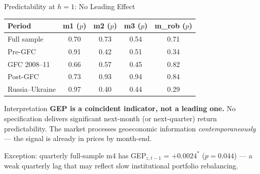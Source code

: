 \documentclass[aspectratio=169]{beamer}
\begin{document}
\begin{frame}{Predictability at $h=1$: No Leading Effect}

\begin{center}
\footnotesize
\renewcommand{\arraystretch}{1.25}
\begin{tabular}{@{}lcccc@{}}
\toprule
\textbf{Period} & \textbf{m1} ($p$) & \textbf{m2} ($p$) & \textbf{m3} ($p$) & \textbf{m\_rob} ($p$) \\
\midrule
Full sample    & 0.70 & 0.73 & 0.54 & 0.71 \\
Pre-GFC        & 0.91 & 0.42 & 0.51 & 0.34 \\
GFC 2008--11   & 0.66 & 0.57 & 0.45 & 0.82 \\
Post-GFC       & 0.73 & 0.93 & 0.94 & 0.84 \\
Russia--Ukraine & 0.97 & 0.40 & 0.44 & 0.29 \\
\bottomrule
\end{tabular}
\end{center}

\medskip
\begin{block}{Interpretation}
\textbf{GEP is a coincident indicator, not a leading one.}
No specification delivers significant next-month (or next-quarter) return
predictability. The market processes geoeconomic information
\emph{contemporaneously} — the signal is already in prices by month-end.
\end{block}

\medskip\small
Exception: quarterly full-sample m4 has GEP$_{z,t-1}$ = $+0.0024^*$ ($p=0.044$) —
a weak quarterly lag that may reflect slow institutional portfolio rebalancing.

\end{frame}
\end{document}

